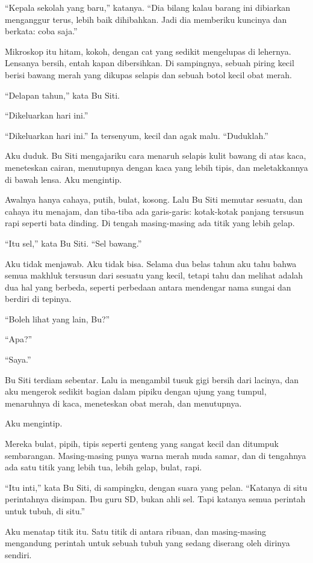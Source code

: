 \documentclass[11pt,twoside,openany]{book}
\begin{document}
``Kepala sekolah yang baru,'' katanya. ``Dia bilang kalau barang ini dibiarkan menganggur terus, lebih baik dihibahkan. Jadi dia memberiku kuncinya dan berkata: coba saja.''

Mikroskop itu hitam, kokoh, dengan cat yang sedikit mengelupas di lehernya. Lensanya bersih, entah kapan dibersihkan. Di sampingnya, sebuah piring kecil berisi bawang merah yang dikupas selapis dan sebuah botol kecil obat merah.

``Delapan tahun,'' kata Bu Siti.

``Dikeluarkan hari ini.''

``Dikeluarkan hari ini.'' Ia tersenyum, kecil dan agak malu. ``Duduklah.''

Aku duduk. Bu Siti mengajariku cara menaruh selapis kulit bawang di atas kaca, meneteskan cairan, menutupnya dengan kaca yang lebih tipis, dan meletakkannya di bawah lensa. Aku mengintip.

Awalnya hanya cahaya, putih, bulat, kosong. Lalu Bu Siti memutar sesuatu, dan cahaya itu menajam, dan tiba-tiba ada garis-garis: kotak-kotak panjang tersusun rapi seperti bata dinding. Di tengah masing-masing ada titik yang lebih gelap.

``Itu sel,'' kata Bu Siti. ``Sel bawang.''

Aku tidak menjawab. Aku tidak bisa. Selama dua belas tahun aku tahu bahwa semua makhluk tersusun dari sesuatu yang kecil, tetapi tahu dan melihat adalah dua hal yang berbeda, seperti perbedaan antara mendengar nama sungai dan berdiri di tepinya.

``Boleh lihat yang lain, Bu?''

``Apa?''

``Saya.''

Bu Siti terdiam sebentar. Lalu ia mengambil tusuk gigi bersih dari lacinya, dan aku mengerok sedikit bagian dalam pipiku dengan ujung yang tumpul, menaruhnya di kaca, meneteskan obat merah, dan menutupnya.

Aku mengintip.

Mereka bulat, pipih, tipis seperti genteng yang sangat kecil dan ditumpuk sembarangan. Masing-masing punya warna merah muda samar, dan di tengahnya ada satu titik yang lebih tua, lebih gelap, bulat, rapi.

``Itu inti,'' kata Bu Siti, di sampingku, dengan suara yang pelan. ``Katanya di situ perintahnya disimpan. Ibu guru SD, bukan ahli sel. Tapi katanya semua perintah untuk tubuh, di situ.''

Aku menatap titik itu. Satu titik di antara ribuan, dan masing-masing mengandung perintah untuk sebuah tubuh yang sedang diserang oleh dirinya sendiri.
\end{document}
